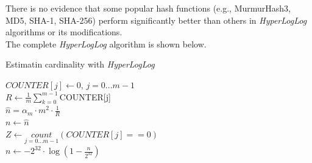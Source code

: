 \documentclass[a4paper,13pt]{article}
\theoremstyle{mytheor}
\begin{document}
\indent There is no evidence that some popular hash functions (e.g., MurmurHash3,
MD5, SHA-1, SHA-256) perform significantly better than others in \textit{HyperLogLog} algorithms
or its modifications.\\
\indent The complete \textit{HyperLogLog} algorithm is shown below.\\
\begin{algorithm}[H]
    \vspace{0.25cm}
    \DontPrintSemicolon
    \LinesNumberedHidden
    \caption[]{Estimatin cardinality with \textit{HyperLogLog}}
    $COUNTER[j] \gets $0, $j = 0...m - 1$\\
    $R \gets \frac{1}{m} \sum\limits_{k=0}^{m-1}$COUNTER[j] \\
    $\hat{n} = \alpha_m \cdot m^2 \cdot \frac{1}{R}$ \\
    $n \gets \hat{n}$ \\
    {
        $Z \gets \underset{j=0...m-1}{count}\left(COUNTER[j] == 0\right)$\\
    }
    {
        $n \gets -2^{32}\cdot\log\left(1-\frac{n}{2^{32}}\right)$
    }
    \vspace{0.25cm}
\end{algorithm}
\vspace{0.25cm}
\end{document}
